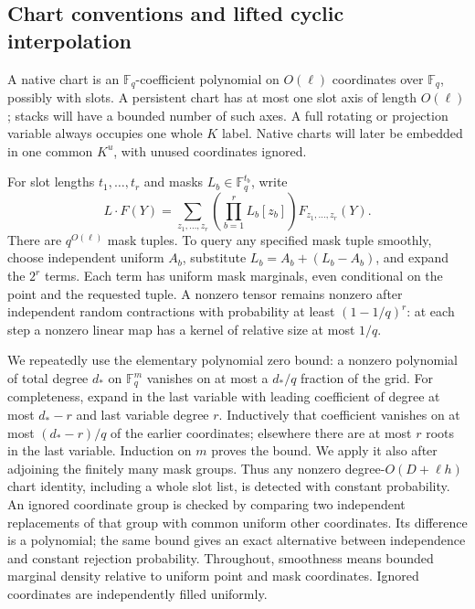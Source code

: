 \subsection{Chart conventions and lifted cyclic interpolation}
\label{ia:lifts-and-masks}

A native chart is an $\mathbb F_q$-coefficient polynomial on
$O(\ell)$ coordinates over $\mathbb F_q$, possibly with slots.  A
persistent chart has at most one slot axis of length $O(\ell)$; stacks
will have a bounded number of such axes.  A full rotating or projection
variable always occupies one whole $K$ label.  Native charts will later
be embedded in one common $K^u$, with unused coordinates ignored.

For slot lengths $t_1,\ldots,t_r$ and masks
$L_b\in\mathbb F_q^{t_b}$, write
\begin{equation}
 L\cdot F(Y)=\sum_{z_1,\ldots,z_r}
             \left(\prod_{b=1}^r L_b[z_b]\right)
             F_{z_1,\ldots,z_r}(Y).                \label{ia:contraction}
\end{equation}
There are $q^{O(\ell)}$ mask tuples.  To query any specified mask tuple
smoothly, choose independent uniform $A_b$, substitute
$L_b=A_b+(L_b-A_b)$, and expand the $2^r$ terms.  Each term has uniform
mask marginals, even conditional on the point and the requested tuple.
A nonzero tensor remains nonzero after independent random contractions
with probability at least $(1-1/q)^r$: at each step a nonzero linear
map has a kernel of relative size at most $1/q$.

We repeatedly use the elementary polynomial zero bound: a nonzero
polynomial of total degree $d_*$ on $\mathbb F_q^m$ vanishes on at most
a $d_*/q$ fraction of the grid.  For completeness, expand in the last
variable with leading coefficient of degree at most $d_*-r$ and last
variable degree $r$.  Inductively that coefficient vanishes on at most
$(d_*-r)/q$ of the earlier coordinates; elsewhere there are at most
$r$ roots in the last variable.  Induction on $m$ proves the bound.
We apply it also after adjoining the finitely many mask groups.
Thus any nonzero degree-$O(D+\ell h)$ chart identity, including a
whole slot list, is detected with constant probability.  An ignored
coordinate group is checked by comparing two independent replacements
of that group with common uniform other coordinates.  Its difference
is a polynomial; the same bound gives an exact alternative between
independence and constant rejection probability.  Throughout, smoothness
means bounded marginal density relative to uniform point and mask
coordinates.  Ignored coordinates are independently filled uniformly.

